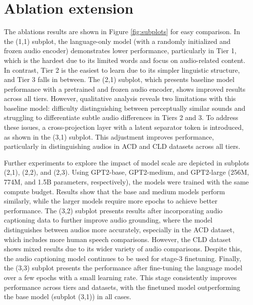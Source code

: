 \section{Ablation extension} \label{appendix: ablation extension} \vspace{-0.1in}
The ablations results are shown in Figure \ref{fig:subplots} for easy comparison. In the (1,1) subplot, the language-only model (with a randomly initialized and frozen audio encoder) demonstrates lower performance, particularly in Tier 1, which is the hardest due to its limited words and focus on audio-related content. In contrast, Tier 2 is the easiest to learn due to its simpler linguistic structure, and Tier 3 falls in between. The (2,1) subplot, which presents baseline model performance with a pretrained and frozen audio encoder, shows improved results across all tiers. However, qualitative analysis reveals two limitations with this baseline model: difficulty distinguishing between perceptually similar sounds and struggling to differentiate subtle audio differences in Tiers 2 and 3. To address these issues, a cross-projection layer with a latent separator token is introduced, as shown in the (3,1) subplot. This adjustment improves performance, particularly in distinguishing audios in ACD and CLD datasets across all tiers.

Further experiments to explore the impact of model scale are depicted in subplots (2,1), (2,2), and (2,3). Using GPT2-base, GPT2-medium, and GPT2-large (256M, 774M, and 1.5B parameters, respectively), the models were trained with the same compute budget. Results show that the base and medium models perform similarly, while the larger models require more epochs to achieve better performance. The (3,2) subplot presents results after incorporating audio captioning data to further improve audio grounding, where the model distinguishes between audios more accurately, especially in the ACD dataset, which includes more human speech comparisons. However, the CLD dataset shows mixed results due to its wider variety of audio comparisons. Despite this, the audio captioning model continues to be used for stage-3 finetuning. Finally, the (3,3) subplot presents the performance after fine-tuning the language model over a few epochs with a small learning rate. This stage consistently improves performance across tiers and datasets, with the finetuned model outperforming the base model (subplot (3,1)) in all cases.

